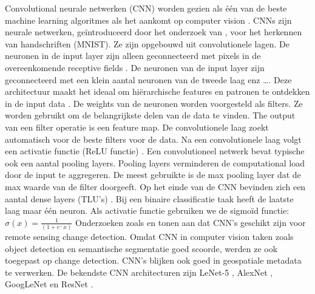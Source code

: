 Convolutional neurale netwerken (CNN) worden gezien als één van de beste machine learning algoritmes als het aankomt op computer vision \autocite{Geron2022}.
CNNs zijn neurale netwerken, geïntroduceerd door het onderzoek van \textcite{LeCun2002}, voor het herkennen van handschriften (MNIST).
Ze zijn opgebouwd uit convolutionele lagen. De neuronen in de input layer zijn alleen geconnecteerd met pixels in de 
overeenkomende receptive fields \autocite{LeCun2002}. De neuronen van de input layer zijn geconnecteerd met een klein aantal neuronen 
van de tweede laag enz \ldots. Deze architectuur maakt het ideaal om hiërarchische features en patronen te ontdekken in de input data \autocite{Bengio2017}.
\newline
\newline
De weights van de neuronen worden voorgesteld als filters. Ze worden gebruikt om de belangrijkste delen van de data te vinden. 
The output van een filter operatie is een feature map. De convolutionele laag zoekt automatisch voor de beste filters voor de data. 
Na een convolutionele laag volgt een activatie functie (ReLU functie) \autocite{krizhevsky2012imagenet}. Een convolutioneel netwerk bevat typische ook een aantal 
pooling layers. Pooling layers verminderen de computational load door de input te aggregeren. De meest gebruikte is de max pooling layer dat de 
max waarde van de filter doorgeeft. Op het einde van de CNN bevinden zich een aantal dense layers (TLU's) \autocite{Geron2022}.
Bij een binaire classificatie taak heeft de laatste laag maar één neuron. Als activatie functie gebruiken we de sigmoïd functie: \(\sigma(x) = \frac{1}{(1 + e^-x)} \)
\newline
\newline
Onderzoeken zoals \textcite{zhu2017deep} en \textcite{Bai_2022} tonen aan dat CNN's geschikt zijn voor remote sensing change detection.
Omdat CNN in computer vision taken zoals object detection en semantische segmentatie goed scoorde, werden ze ook toegepast op change detection.
CNN's blijken ook goed in geospatiale metadata te verwerken.
\newline
De bekendste CNN architecturen zijn LeNet-5 \textcite{LeCun2002}, AlexNet \textcite{krizhevsky2012imagenet}, GoogLeNet \textcite{Szegedy2015}
en ResNet \textcite{He2016}. 
\newline
\newline


